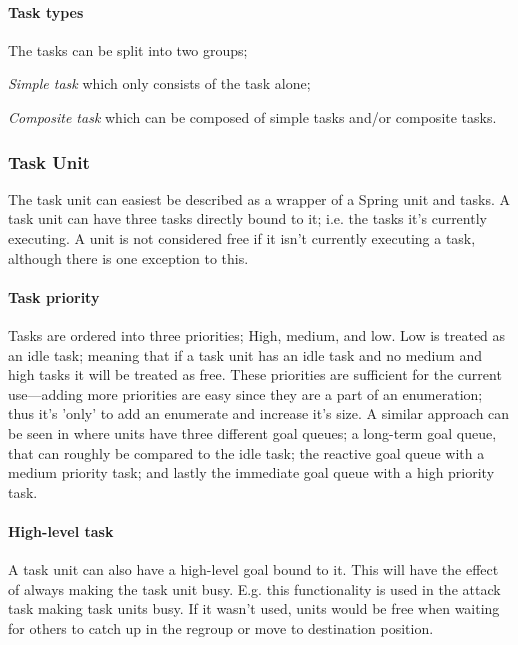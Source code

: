 \paragraph{Task types}
\label{sec:task_types}
The tasks can be split into two groups;
\begin{inparaenum}
\item \emph{Simple task} which only consists of the task alone;
\item \emph{Composite task} which can be composed of simple tasks and/or
composite tasks.
\end{inparaenum}

\subsubsection{Task Unit}
The task unit can easiest be described as a wrapper of a Spring unit and tasks. A task unit can have
three tasks directly bound to it; i.e. the tasks it's currently executing. A unit is not
considered free if it isn't currently executing a task, although there is one exception to this.

\paragraph{Task priority}
\label{sec:task_priority}
Tasks are ordered into three priorities; High, medium, and low. Low is treated as an
idle task; meaning that if a task unit has an idle task and no medium and high tasks it will be treated
as free. These priorities are sufficient for the current use---adding more priorities are easy since
they are a part of an enumeration; thus it's 'only' to add an enumerate and increase it's size. A
similar approach can be seen in \cite{Laming08} where units have three different goal queues; a
long-term goal queue, that can roughly be compared to the idle task; the reactive goal queue with a
medium priority task; and lastly the immediate goal queue with a high priority task.

\paragraph{High-level task}
A task unit can also have a high-level goal bound to it. This will have the effect of always making
the task unit busy. E.g. this functionality is used in the attack task making task units busy. If
it wasn't used, units would be free when waiting for others to catch up in the
regroup or move to destination position.

